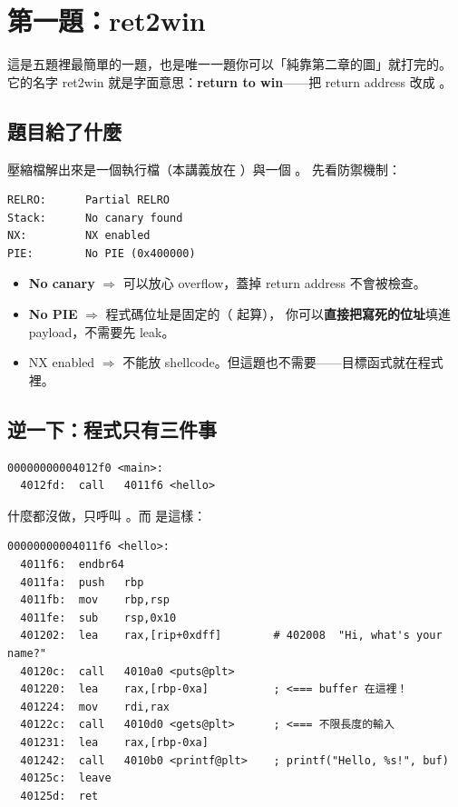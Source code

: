 \section{第一題：ret2win}
\label{chap:ret2win}

這是五題裡最簡單的一題，也是唯一一題你可以「純靠第二章的圖」就打完的。
它的名字 ret2win 就是字面意思：\textbf{return to win}——把 return address 改成 。

\subsection{題目給了什麼}

壓縮檔解出來是一個執行檔（本講義放在 ）與一個 。
先看防禦機制：

\begin{lstlisting}[style=raw]
RELRO:      Partial RELRO
Stack:      No canary found
NX:         NX enabled
PIE:        No PIE (0x400000)
\end{lstlisting}

\begin{keybox}[這四行直接決定打法]
\begin{itemize}[leftmargin=1.4em,itemsep=1pt]
  \item \textbf{No canary} $\Rightarrow$ 可以放心 overflow，蓋掉 return address 不會被檢查。
  \item \textbf{No PIE} $\Rightarrow$ 程式碼位址是固定的（ 起算），
        你可以\textbf{直接把寫死的位址}填進 payload，不需要先 leak。
  \item NX enabled $\Rightarrow$ 不能放 shellcode。但這題也不需要——目標函式就在程式裡。
\end{itemize}
\end{keybox}

\subsection{逆一下：程式只有三件事}

\begin{lstlisting}[style=asm]
00000000004012f0 <main>:
  4012fd:  call   4011f6 <hello>
\end{lstlisting}

 什麼都沒做，只呼叫 。而  是這樣：

\begin{lstlisting}[style=asm]
00000000004011f6 <hello>:
  4011f6:  endbr64
  4011fa:  push   rbp
  4011fb:  mov    rbp,rsp
  4011fe:  sub    rsp,0x10
  401202:  lea    rax,[rip+0xdff]        # 402008  "Hi, what's your name?"
  40120c:  call   4010a0 <puts@plt>
  401220:  lea    rax,[rbp-0xa]          ; <=== buffer 在這裡！
  401224:  mov    rdi,rax
  40122c:  call   4010d0 <gets@plt>      ; <=== 不限長度的輸入
  401231:  lea    rax,[rbp-0xa]
  401242:  call   4010b0 <printf@plt>    ; printf("Hello, %s!", buf)
  40125c:  leave
  40125d:  ret
\end{lstlisting}

